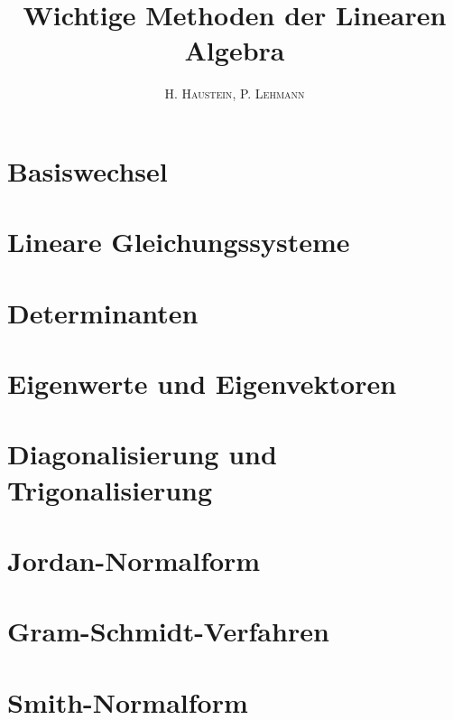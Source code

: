 \documentclass[ngerman,a4paper]{article}
\title{\textbf{Wichtige Methoden der Linearen Algebra}}
\author{\textsc{H. Haustein}, \textsc{P. Lehmann}}
\begin{document}
\maketitle

\section{Basiswechsel}

\section{Lineare Gleichungssysteme}

\section{Determinanten}

\section{Eigenwerte und Eigenvektoren}

\section{Diagonalisierung und Trigonalisierung}

\section{Jordan-Normalform}

\section{Gram-Schmidt-Verfahren}

\section{Smith-Normalform}
\end{document}
